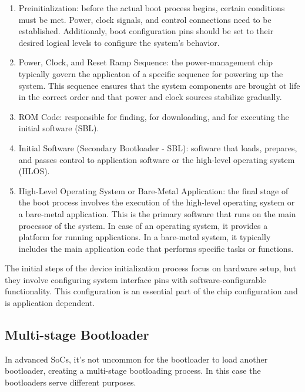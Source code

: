 \begin{enumerate}
    \item   Preinitialization: before the actual boot process begins, certain
            conditions must be met. Power, clock signals, and control
            connections need to be established. Additionaly, boot configuration
            pins should be set to their desired logical levels to configure
            the system's behavior.
    \item   Power, Clock, and Reset Ramp Sequence: the power-management chip
            typically govern the applicaton of a specific sequence for powering
            up the system. This sequence ensures that the system components are
            brought ot life in the correct order and that power and clock
            sources stabilize gradually.
    \item   ROM Code: responsible for finding, for downloading, and for
            executing the initial software (SBL).
    \item   Initial Software (Secondary Bootloader - SBL): software that loads,
            prepares, and passes control to application software or the
            high-level operating system (HLOS).
    \item   High-Level Operating System or Bare-Metal Application: the final
            stage of the boot process involves the execution of the high-level
            operating system or a bare-metal application. This is the primary
            software that runs on the main processor of the system. In case of
            an operating system, it provides a platform for running
            applications. In a bare-metal system, it typically includes the
            main application code that performs specific tasks or functions.
\end{enumerate}

The initial steps of the device initialization process focus on hardware setup,
but they involve configuring system interface pins with software-configurable
functionality. This configuration is an essential part of the chip
configuration and is application dependent.

\subsection{Multi-stage Bootloader}

In advanced SoCs, it's not uncommon for the bootloader to load another
bootloader, creating a multi-stage bootloading process.
In this case the bootloaders serve different purposes.

